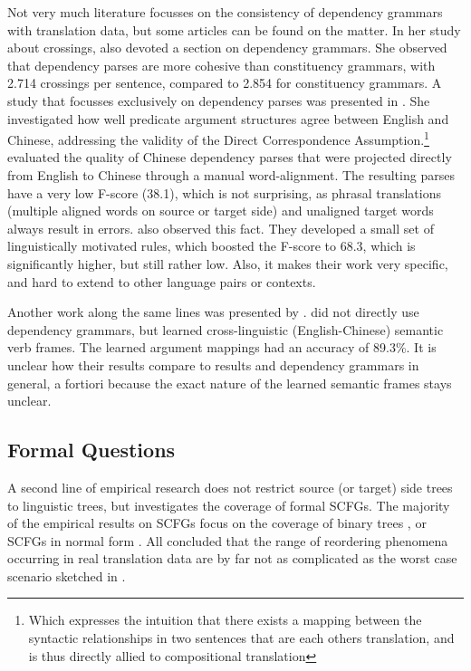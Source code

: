 Not very much literature focusses on the consistency of dependency grammars with translation data, but some articles can be found on the matter. In her study about crossings, \citeauthor{fox2002phrasal} also devoted a section on dependency grammars. She observed that dependency parses are more cohesive than constituency grammars, with
2.714 crossings per sentence, compared to 2.854 for constituency grammars. A study that focusses exclusively on dependency parses was presented in \cite{hwa2002evaluating}. She investigated how well predicate argument structures agree between English and Chinese, addressing the validity of the Direct Correspondence Assumption.\footnote{Which expresses the intuition that there exists a mapping between the syntactic relationships in two sentences that are each others translation, and is thus directly allied to compositional translation} \citeauthor{hwa2002evaluating} evaluated the quality of Chinese dependency parses that were projected directly from English to Chinese through a manual word-alignment. The resulting parses have a very low F-score (38.1), which is not surprising, as phrasal translations (multiple aligned words on source or target side) and unaligned target words always result in errors. \citeauthor{hwa2002evaluating} also observed this fact. They developed a small set of linguistically motivated rules, which boosted the F-score to 68.3, which is significantly higher, but still rather low. Also, it makes their work very specific, and hard to extend to other language pairs or contexts.

Another work along the same lines was presented by \cite{fung2006automatic}. \citeauthor{fung2006automatic} did not directly use dependency grammars, but learned cross-linguistic (English-Chinese) semantic verb frames. The learned argument mappings  had an accuracy of 89.3\%. It is unclear how their results compare to  results and dependency grammars in general, a fortiori because the exact nature of the learned semantic frames stays unclear.

\subsection{Formal Questions}

A second line of empirical research does not restrict source (or target) side trees to linguistic trees, but investigates the coverage of formal SCFGs. The majority of the empirical results on SCFGs focus on the coverage of binary trees \citep[e.g.,]{zhang2006synchronous,huang2009binarization}, or SCFGs in normal form \citep[e.g.,][]{sogaard2009empirical1,sogaard2009empirical2,sogaard2010can}. All concluded that the range of reordering phenomena occurring in real translation data are by far not as complicated as the worst case scenario sketched in \cite{satta2005some}.

